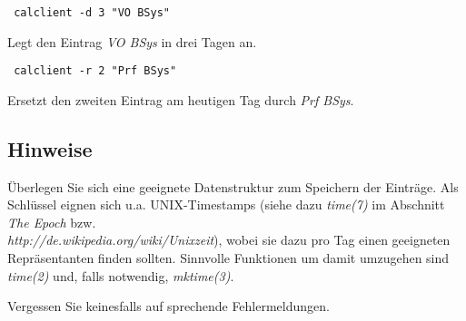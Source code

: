 \begin{verbatim} calclient -d 3 "VO BSys" 
\end{verbatim}
Legt den Eintrag \emph{VO BSys} in drei Tagen an.

\begin{verbatim} calclient -r 2 "Prf BSys" 
\end{verbatim}
Ersetzt den zweiten Eintrag am heutigen Tag durch \emph{Prf BSys}.

\subsection*{Hinweise}
Überlegen Sie sich eine geeignete Datenstruktur zum Speichern der Einträge. Als 
Schlüssel eignen sich u.a. UNIX-Timestamps (siehe dazu \emph{time(7)} im Abschnitt \emph{The Epoch}
bzw.\\ \emph{http://de.wikipedia.org/wiki/Unixzeit}), wobei sie dazu pro Tag einen geeigneten
Repräsentanten finden sollten. Sinnvolle Funktionen um damit umzugehen sind \emph{time(2)} und,
falls notwendig, \emph{mktime(3)}.

Vergessen Sie keinesfalls auf sprechende Fehlermeldungen.

\osueguidelinesthree



